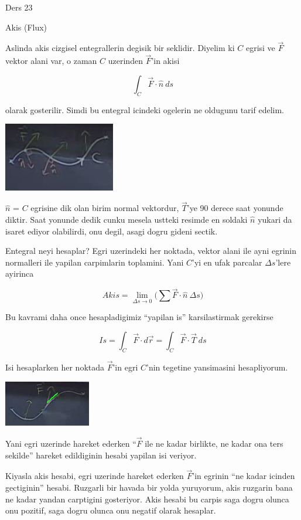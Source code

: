 \documentclass[12pt,fleqn]{article}
\begin{document}
Ders 23

Akis (Flux)

Aslinda akis cizgisel entegrallerin degisik bir seklidir. Diyelim ki $C$
egrisi ve $\vec{F}$ vektor alani var, o zaman $C$ uzerinden $\vec{F}$'in
akisi 

\[ \int_C \vec{F} \cdot \hat{n} \ ds \]

olarak gosterilir. Simdi bu entegral icindeki ogelerin ne oldugunu tarif
edelim. 

\includegraphics[height=3cm]{23_1.png}

$\hat{n}$ = $C$ egrisine dik olan birim normal vektordur, $\vec{T}$'ye 90
derece saat yonunde diktir. Saat yonunde dedik cunku mesela ustteki resimde
en soldaki $\hat{n}$ yukari da isaret ediyor olabilirdi, onu degil, asagi
dogru gideni sectik.

Entegral neyi hesaplar? Egri uzerindeki her noktada, vektor alani ile ayni
egrinin normalleri ile yapilan carpimlarin toplamini. Yani $C$'yi en ufak
parcalar $\Delta s$'lere ayirinca 

\[ Akis = \lim_{\Delta s \to 0} 
\bigg( \sum \vec{F} \cdot \hat{n} \ \Delta s \bigg) \]

Bu kavrami daha once hesapladigimiz ``yapilan is'' karsilastirmak
gerekirse

\[ Is = \int_C \vec{F} \cdot d\vec{r} = \int_C \vec{F} \cdot \vec{T} \ ds \]

Isi hesaplarken her noktada $\vec{F}$'in egri $C$'nin tegetine yansimasini
hesapliyorum. 

\includegraphics[height=2cm]{23_2.png}

Yani egri uzerinde hareket ederken ``$\vec{F}$ ile ne kadar birlikte, ne
kadar ona ters sekilde'' hareket edildiginin hesabi yapilan isi veriyor. 

Kiyasla akis hesabi, egri uzerinde hareket ederken $\vec{F}$'in egrinin
``ne kadar icinden gectiginin'' hesabi. Ruzgarli bir havada bir yolda
yuruyorum, akis ruzgarin bana ne kadar yandan carptigini gosteriyor. Akis
hesabi bu carpis saga dogru olunca onu pozitif, saga dogru olunca onu
negatif olarak hesaplar. 
\end{document}
